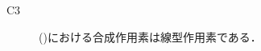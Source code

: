 \begin{prf}
\begin{description}
			\item[C3] ()における合成作用素は線型作用素である．
				\begin{comment}
				(\refeq{eq:Lp_sp_embedding})で定めた単射$J_{\mathcal{G}}$を$J$と表す．
				\begin{description}
					\item[加法について]
						射影定理により任意の$h \in J \Lp{2}{\Omega, \mathcal{G},\mu}$に対して
						\begin{align}
							&\inprod<(f_1 + f_2) - J\cexp{f_1 + f_2}{\mathcal{G}}, h>_{\Lp{2}{\mathcal{F}}} = 0, \\
							&\inprod<f_1 - J\cexp{f_1}{\mathcal{G}}, h>_{\Lp{2}{\mathcal{F}}} = 0
							,\quad \inprod<f_2 - J\cexp{f_2}{\mathcal{G}}, h>_{\Lp{2}{\mathcal{F}}} = 0
						\end{align}
						が成り立つから，任意の$h \in J\Lp{2}{\Omega, \mathcal{G},\mu}$に対して
						\begin{align}
							0 &= \inprod<(f_1 + f_2) - J\cexp{f_1 + f_2}{\mathcal{G}}, h>_{\Lp{2}{\mathcal{F}}} \\
								&\qquad- \inprod<f_1 - J\cexp{f_1}{\mathcal{G}}, h>_{\Lp{2}{\mathcal{F}}} - \inprod<f_2 - J\cexp{f_2}{\mathcal{G}}, h>_{\Lp{2}{\mathcal{F}}} \\
							&= \inprod<J\cexp{f_1}{\mathcal{G}} + J\cexp{f_2}{\mathcal{G}} - J\cexp{f_1 + f_2}{\mathcal{G}}, h>_{\Lp{2}{\mathcal{F}}}
						\end{align}
						となり，特に$h = J\cexp{f_1}{\mathcal{G}} + J\cexp{f_2}{\mathcal{G}} - J\cexp{f_1 + f_2}{\mathcal{G}} \in J\Lp{2}{\Omega, \mathcal{G},\mu}$として
						\begin{align}
							\Norm{J\cexp{f_1}{\mathcal{G}} + J\cexp{f_2}{\mathcal{G}} - J\cexp{f_1 + f_2}{\mathcal{G}}}{\Lp{2}{\mathcal{F}}}^2 = 0
						\end{align}
						を得る．$J$の線型単射性により
						\begin{align}
							\cexp{f_1}{\mathcal{G}} + \cexp{f_2}{\mathcal{G}} = \cexp{f_1 + f_2}{\mathcal{G}}
						\end{align}
						が従う．
						

\end{comment}
\end{description}
\end{prf}
